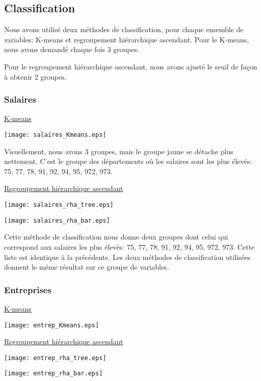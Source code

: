 \documentclass[a4paper,11pt]{article}
\begin{document}
\subsection{Classification}
Nous avons utilisé deux méthodes de classification, pour chaque ensemble de variables: K-means et regroupement hiérarchique ascendant.
Pour le K-means, nous avons demandé chaque fois 3 groupes.

Pour le regroupement hiérarchique ascendant, nous avons ajusté le seuil de façon à obtenir 2 groupes.

\subsubsection{Salaires}
\underline{K-means}
\begin{center}
\texttt{[image: salaires\_Kmeans.eps]}
\end{center}
Visuellement, nous avons 3 groupes, mais le groupe jaune se détache plus nettement.
C'est le groupe des départements où les salaires sont les plus élevés: 
75, 77, 78, 91, 92, 94, 95, 972, 973.

\medskip
\underline{Regroupement hiérarchique ascendant}

\begin{center}
\texttt{[image: salaires\_rha\_tree.eps]}
\end{center}
\begin{center}
\texttt{[image: salaires\_rha\_bar.eps]}
\end{center}
Cette méthode de classification nous donne deux groupes dont celui qui correspond aux salaires les plus élevés:
75, 77, 78, 91, 92, 94, 95, 972, 973.
Cette liste est identique à la précédente.
Les deux méthodes de classification utilisées donnent le même résultat sur ce groupe de variables.

\subsubsection{Entreprises}
\underline{K-means}
\begin{center}
\texttt{[image: entrep\_Kmeans.eps]}
\end{center}

\medskip
\underline{Regroupement hiérarchique ascendant}
\begin{center}
\texttt{[image: entrep\_rha\_tree.eps]}
\end{center}
\begin{center}
\texttt{[image: entrep\_rha\_bar.eps]}
\end{center}
\end{document}
